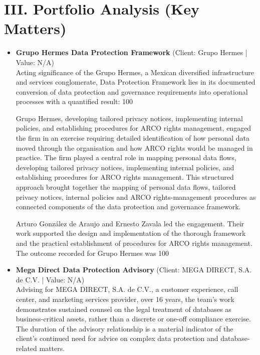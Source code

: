 \documentclass[11pt]{article}
\begin{document}
\section*{III. Portfolio Analysis (Key Matters)}
\begin{itemize}
\item \textbf{Grupo Hermes Data Protection Framework} (Client: Grupo Hermes | Value: N/A)\\ Acting significance of the Grupo Hermes, a Mexican diversified infrastructure and services conglomerate, Data Protection Framework lies in its documented conversion of data protection and governance requirements into operational processes with a quantified result: 100%

Grupo Hermes, developing tailored privacy notices, implementing internal policies, and establishing procedures for ARCO rights management, engaged the firm in an exercise requiring detailed identification of how personal data moved through the organisation and how ARCO rights would be managed in practice. The firm played a central role in mapping personal data flows, developing tailored privacy notices, implementing internal policies, and establishing procedures for ARCO rights management. This structured approach brought together the mapping of personal data flows, tailored privacy notices, internal policies and ARCO rights-management procedures as connected components of the data protection and governance framework.

Arturo González de Araujo and Ernesto Zavala led the engagement. Their work supported the design and implementation of the thorough framework and the practical establishment of procedures for ARCO rights management. The outcome recorded for Grupo Hermes was 100%
\item \textbf{Mega Direct Data Protection Advisory} (Client: MEGA DIRECT, S.A. de C.V. | Value: N/A)\\ Advising for MEGA DIRECT, S.A. de C.V., a customer experience, call center, and marketing services provider, over 16 years, the team’s work demonstrates sustained counsel on the legal treatment of databases as business-critical assets, rather than a discrete or one-off compliance exercise. The duration of the advisory relationship is a material indicator of the client’s continued need for advice on complex data protection and database-related matters.


\end{itemize}
\end{document}
